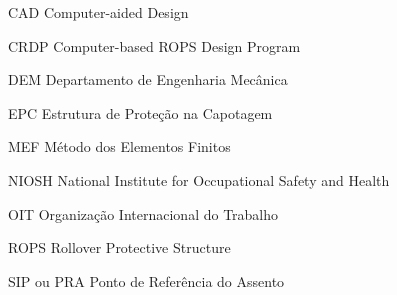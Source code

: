 
\begin{siglas}
	\item[CAD] Computer-aided Design
    \item[CRDP] Computer-based ROPS Design Program
	\item[DEM] Departamento de Engenharia Mecânica
	\item[EPC] Estrutura de Proteção na Capotagem
    \item[MEF] Método dos Elementos Finitos
    \item[NIOSH] National Institute for Occupational Safety and Health
    \item[OIT] Organização Internacional do Trabalho
    \item[ROPS] Rollover Protective Structure
    \item[SIP ou PRA] Ponto de Referência do Assento
\end{siglas}

